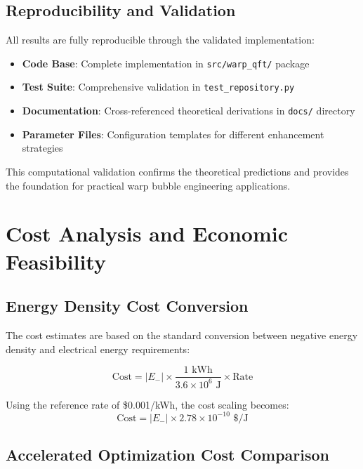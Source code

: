 \documentclass[11pt,a4paper]{article}
\begin{document}
\begin{table}[h]
\subsection{Reproducibility and Validation}

All results are fully reproducible through the validated implementation:
\begin{itemize}
\item \textbf{Code Base}: Complete implementation in \texttt{src/warp\_qft/} package
\item \textbf{Test Suite}: Comprehensive validation in \texttt{test\_repository.py}
\item \textbf{Documentation}: Cross-referenced theoretical derivations in \texttt{docs/} directory
\item \textbf{Parameter Files}: Configuration templates for different enhancement strategies
\end{itemize}

This computational validation confirms the theoretical predictions and provides the foundation for practical warp bubble engineering applications.

\section{Cost Analysis and Economic Feasibility}
\label{sec:cost_analysis}

\subsection{Energy Density Cost Conversion}

The cost estimates are based on the standard conversion between negative energy density and electrical energy requirements:

\begin{equation}
\text{Cost} = |E_-| \times \frac{1 \text{ kWh}}{3.6 \times 10^6 \text{ J}} \times \text{Rate}
\end{equation}

Using the reference rate of \$0.001/kWh, the cost scaling becomes:
\begin{equation}
\text{Cost} = |E_-| \times 2.78 \times 10^{-10} \text{ \$/J}
\end{equation}

\subsection{Accelerated Optimization Cost Comparison}


\end{table}
\end{document}
